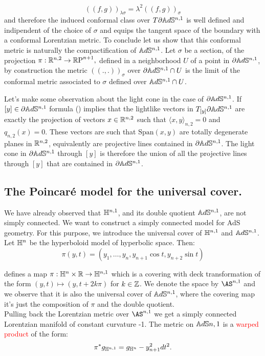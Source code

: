 \begin{equation}\label{25}
    ((f,g))_{\lambda\sigma}=\lambda^2((f,g))_{\sigma}
\end{equation} 
and therefore the induced conformal class over $T\partial\mathbb{A}d\mathbb{S}^{n,1}$ is well defined and indipendent of the choice of $\sigma$ and equips the tangent space of the boundary with a conformal Lorentzian metric. To conclude let us show that this conformal metric is naturally the compactification of $\mathbb{A}d\mathbb{S}^{n,1}$. Let $\sigma$ be a section, of the projection $\pi:\mathbb{R}^{n,2}\to \mathbb{R}\text{P}^{n+1},$ defined in a neighborhood $U$ of a point in $\partial\mathbb{A}d\mathbb{S}^{n,1}$, by construction the metric $((.,.))_\sigma$ over $\partial\mathbb{A}d\mathbb{S}^{n,1}\cap U$ is the limit of the conformal metric associated to $\sigma$ defined over $\mathbb{A}d\mathbb{S}^{n,1}\cap U$. %
\begin{observation}
Let's make some observation about the light cone in the case of $\partial\mathbb{A}d\mathbb{S}^{n,1}$. If $[y]\in\partial\mathbb{A}d\mathbb{S}^{n,1}$ formula () implies that the lightlike vectors in $T_{[y]}\partial\mathbb{A}d\mathbb{S}^{n,1}$ are exactly the projection of vectors $x\in \mathbb{R}^{n,2}$ such that $\langle x,y\rangle_{n,2}=0$ and $q_{n,2}(x)=0$. These vectors are such that $\text{Span}(x,y)$ are totally degenerate planes in $\mathbb{R}^{n,2}$, equivalently are projective lines contained in $\partial\mathbb{A}d\mathbb{S}^{n,1}$. The light cone in $\partial\mathbb{A}d\mathbb{S}^{n,1}$ through $[y]$ is therefore the union of all the projective lines through $[y]$ that are contained in $\partial\mathbb{A}d\mathbb{S}^{n,1}$.

\end{observation}


\subsection{The Poincaré model for the universal cover.}
We have already observed that $\mathbb{H}^{n,1}$, and its double quotient $\mathbb{A}d\mathbb{S}^{n,1}$, are not simply connected. We want to construct a simply connected model for AdS geometry. For this purpose, we introduce the universal cover of $\mathbb{H}^{n,1}$ and $\mathbb{A}d\mathbb{S}^{n,1}$.\\
Let $\mathbb{H}^n$ be the hyperboloid model of hyperbolic space. Then: 
\[
    \pi(y,t)=(y_1,\dots,y_n,y_{n+1}\cos t,y_{n+2}\sin t)
\]

defines a map $\pi:\mathbb{H}^n\times \mathbb{R}\to \mathbb{H}^{n,1}$ which is a covering with deck transformation of the form $(y,t)\mapsto (y,t+2k\pi)$ for $k\in \mathbb{Z}$. We denote the space by $\AS^{n,1}$ and we observe that it is also the universal cover of $\mathbb{A}d\mathbb{S}^{n,1}$, where the covering map it's just the composition of $\pi$ and the double quotient.\\
Pulling back the Lorentzian metric over $\AS^{n,1}$ we get a simply connected Lorentzian manifold of constant curvature -1. The metric on $\mathbb{A}d\mathbb{S}{n,1}$ is a \textcolor{red}{warped product} of the form: 
\begin{equation}\label{metric}
     \pi^*g_{\mathbb{H}^{n,1}}=g_{\mathbb{H}^n}-y_{n+1}^{2}dt^2.
\end{equation}
   

